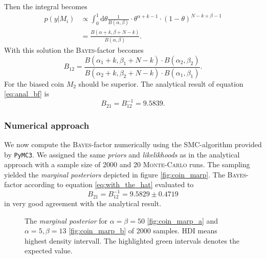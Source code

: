 \documentclass[%
 reprint,
 amsmath,amssymb,
 aps,
]{revtex4-1}
\begin{document}
Then the integral becomes \cite{PyMC3_BF}
\begin{align*}
	p(y|M_i)&\propto \int_{0}^{1} \text{d}\theta \frac{1}{B(\alpha,\beta)} \cdot \theta^{\alpha+k-1}\cdot (1-\theta)^{N-k+\beta-1}\\
	&=\frac{B(\alpha+k,\beta+N-k)}{B(\alpha, \beta)}.
\end{align*}
With this solution the \textsc{Bayes}-factor becomes
\begin{equation}\label{eq:anal_bf}
	B_{12}=\frac{B(\alpha_1+k,\beta_1+N-k)\cdot B(\alpha_2,\beta_2)}{B(\alpha_2+k,\beta_2+N-k)\cdot B(\alpha_1,\beta_1)}.
\end{equation}
For the biased coin $M_2$ should be superior. The analytical result of equation \eqref{eq:anal_bf} is $$B_{21}=B_{12}^{-1}=9.5839.$$

\subsubsection{\textbf{Numerical approach}}
\noindent We now compute the \textsc{Bayes}-factor numerically using the SMC-algorithm provided by \texttt{PyMC3}. We assigned the same \emph{priors} and \emph{likelikhoods} as in the analytical approach with a sample size of 2000 and 20 \textsc{Monte-Carlo} runs. The sampling yielded the \emph{marginal posteriors} depicted in figure \eqref{fig:coin_marp}. 
The \textsc{Bayes}-factor according to equation \eqref{eq:with_the_hat} evaluated to
$$B_{21}=B_{12}^{-1}=9.5829\pm0.4719$$
in very good agreement with the analytical result.
\begin{figure}[htbp]
	\begin{subfigure}{\linewidth}
		\subcaption{}\label{fig:coin_marp_a}
	\end{subfigure}
	\begin{subfigure}{\linewidth}
		\subcaption{}\label{fig:coin_marp_b}
	\end{subfigure}
	\caption{The \emph{marginal posterior} for $\alpha=\beta=50$ \eqref{fig:coin_marp_a} and $\alpha=5, \beta=13$ \eqref{fig:coin_marp_b} of 2000 samples. HDI means highest density intervall. The highlighted green intervals denotes the expected value.}\label{fig:coin_marp}
\end{figure}
\end{document}
